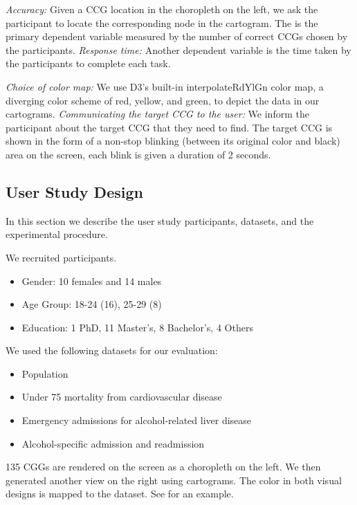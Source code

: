 \textit{Accuracy:} Given a CCG location in the choropleth on the left, we ask the participant to locate the corresponding node in the cartogram. The is the primary dependent variable measured by the number of correct CCGs chosen by the participants. \textit{Response time:} Another dependent variable is the time taken by the participants to complete each task.

\textit{Choice of color map:} We use D3's built-in interpolateRdYlGn color map, a diverging color scheme of red, yellow, and green, to depict the data in our cartograms. \textit{Communicating the target CCG to the user:} We inform the participant about the target CCG that they need to find. The target CCG is shown in the form of a non-stop blinking (between its original color and black) area on the screen, each blink is given a duration of 2 seconds.

\subsection{User Study Design}
In this section we describe the user study participants, datasets, and the experimental procedure.

 We recruited \pCount participants.

\begin{itemize}
    \item Gender: 10 females and 14 males
    \item Age Group: 18-24 (16), 25-29 (8)
    \item Education: 1 PhD, 11 Master's, 8 Bachelor's, 4 Others
\end{itemize}

 We used the following datasets for our evaluation:

\begin{itemize}
    \item Population
    \item Under 75 mortality from cardiovascular disease
    \item Emergency admissions for alcohol-related liver disease
    \item Alcohol-specific admission and readmission
\end{itemize}

135 CGGs are rendered on the screen as a choropleth on the left. We then generated another view on the right using cartograms. The color in both visual designs is mapped to the dataset. See  for an example.

